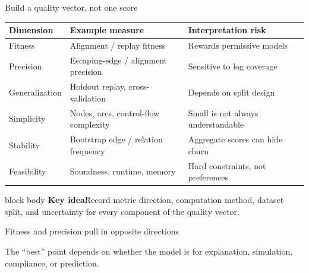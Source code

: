 \documentclass[aspectratio=169,11pt]{beamer}
\newcommand{\keyidea}[1]{%
  \begin{beamercolorbox}[rounded=true,sep=0.65em]{block body}
    \textbf{\color{Teal}Key idea}\quad #1
  \end{beamercolorbox}
}
\begin{document}
\begin{frame}{Build a quality vector, not one score}
  \scriptsize
  \begin{tabular}{@{}p{}p{}p{}@{}}
    \toprule
    Dimension & Example measure & Interpretation risk\\
    \midrule
    Fitness & Alignment / replay fitness & Rewards permissive models\\
    Precision & Escaping-edge / alignment precision & Sensitive to log coverage\\
    Generalization & Holdout replay, cross-validation & Depends on split design\\
    Simplicity & Nodes, arcs, control-flow complexity & Small is not always understandable\\
    Stability & Bootstrap edge / relation frequency & Aggregate scores can hide churn\\
    Feasibility & Soundness, runtime, memory & Hard constraints, not preferences\\
    \bottomrule
  \end{tabular}
  \vspace{0.2cm}
  \keyidea{Record metric direction, computation method, dataset split, and
  uncertainty for every component of the quality vector.}
\end{frame}

\begin{frame}{Fitness and precision pull in opposite directions}
  \centering
  \par
  \vspace{0.25cm}
  The ``best'' point depends on whether the model is for explanation,
  simulation, compliance, or prediction.
\end{frame}
\end{document}
